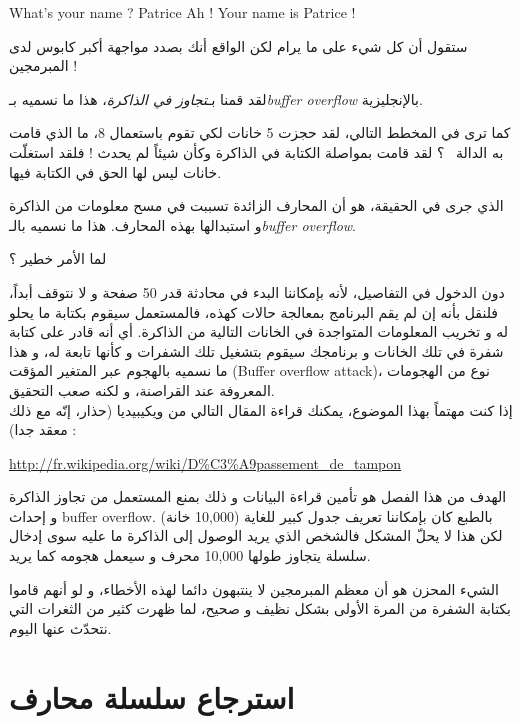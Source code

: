 \begin{Console}
What's your name ? Patrice
Ah ! Your name is Patrice !
\end{Console}

ستقول أن كل شيء على ما يرام لكن الواقع أنك بصدد مواجهة أكبر كابوس لدى المبرمجين !

لقد قمنا بـ\emph{تجاوز في الذاكرة}،
 هذا ما نسميه بـ\emph{\textenglish{buffer overflow}}
بالإنجليزية.

كما ترى في المخطط التالي، لقد حجزت 5 خانات لكي تقوم باستعمال 8، ما الذي قامت به الدالة
~؟
 لقد قامت بمواصلة الكتابة في الذاكرة وكأن شيئاً لم يحدث ! فلقد استغلّت خانات ليس لها الحق في الكتابة فيها.


الذي جرى في الحقيقة، هو أن المحارف الزائدة تسببت في مسح معلومات من الذاكرة و استبدالها بهذه المحارف. هذا ما نسميه بالـ\emph{\textenglish{buffer overflow}}.


\begin{question}
  لما الأمر خطير ؟
\end{question}

دون الدخول في التفاصيل، لأنه بإمكاننا البدء في محادثة  قدر 50 صفحة و لا نتوقف أبداً، فلنقل بأنه إن لم يقم البرنامج بمعالجة حالات كهذه، فالمستعمل سيقوم بكتابة ما يحلو له و تخريب المعلومات المتواجدة في الخانات التالية من الذاكرة. أي أنه قادر على كتابة شفرة في تلك الخانات و برنامجك سيقوم بتشغيل تلك الشفرات و كأنها تابعة له، و هذا ما نسميه بالهجوم عبر المتغير المؤقت
(\textenglish{Buffer overflow attack})،
نوع من الهجومات المعروفة عند القراصنة، و لكنه صعب التحقيق.\\
إذا كنت مهتماً بهذا الموضوع، يمكنك قراءة المقال التالي من ويكيبيديا (حذار، إنّه مع ذلك معقد جدا) :

\url{http://fr.wikipedia.org/wiki/D%C3%A9passement_de_tampon}

الهدف من هذا الفصل هو تأمين قراءة البيانات و ذلك بمنع المستعمل من تجاوز الذاكرة و إحداث
\textenglish{buffer overflow}.
بالطبع كان بإمكاننا تعريف جدول كبير للغاية (10,000 خانة) لكن هذا لا يحلّ المشكل فالشخص الذي يريد الوصول إلى الذاكرة ما عليه سوى إدخال سلسلة يتجاوز طولها 10,000 محرف و سيعمل هجومه كما يريد.

الشيء المحزن هو أن معظم المبرمجين لا ينتبهون دائما لهذه الأخطاء، و لو أنهم قاموا بكتابة الشفرة من المرة الأولى بشكل نظيف و صحيح، لما ظهرت كثير من الثغرات التي نتحدّث عنها اليوم.

\section{استرجاع سلسلة محارف}

